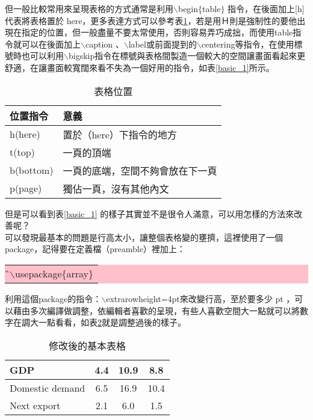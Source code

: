 但一般比較常用來呈現表格的方式通常是利用$\backslash$begin$\lbrace$table$\rbrace$ 指令，在後面加上[h]代表將表格置於 here，更多表達方式可以參考表\ref{location}，若是用Ｈ則是強制性的要他出現在指定的位置，但一般盡量不要太常使用，否則容易弄巧成拙，而使用table指令就可以在後面加上$\backslash$caption 、$\backslash$label或前面提到的$\backslash$centering等指令，在使用標號時也可以利用$\backslash$bigskip指令在標號與表格間製造一個較大的空間讓畫面看起來更舒適，在讓畫面較寬闊來看不失為一個好用的指令，如表\ref{basic_1}所示。\\
\begin{table}[h] 
    \centering 
    \caption{表格位置}\label{location}  %
    \bigskip
    \begin{tabular}{p{2.5cm}l}
    位置指令 & 意義 \\\toprule[0.8pt]
    h(here) & 置於（here）下指令的地方\\
    t(top) & 一頁的頂端\\
    b(bottom) & 一頁的底端，空間不夠會放在下一頁\\
    p(page) & 獨佔一頁，沒有其他內文\\\bottomrule[1pt]
    \end{tabular}
\end{table}
但是可以看到表\ref{basic_1} 的樣子其實並不是很令人滿意，可以用怎樣的方法來改善呢？\\
可以發現最基本的問題是行高太小，讓整個表格變的壅擠，這裡使用了一個package，記得要在定義檔（preamble）裡加上：
\begin{center}
	\colorbox{pink}{\begin{tabular}{p{}}
	{\G $\backslash$usepackage\{array\}}
\end{tabular}}
\end{center}
\bigskip
利用這個package的指令：$\backslash$extrarowheight=4pt來改變行高，至於要多少 pt ，可以藉由多次編譯做調整，依編輯者喜歡的呈現，有些人喜歡空間大一點就可以將數字在調大一點看看，如表\ref{basic_2}就是調整過後的樣子。\\
\begin{table}[h] 
	\centering 
	\caption{修改後的基本表格}\label{basic_2}  
	\extrarowheight=4pt   %
	\begin{tabular}{|l|ccc|}
	\hline  %
  GDP  & 4.4  & 10.9 & 8.8		\\\hline  %
  Domestic demand     & 6.5     & 16.9 & 10.4		\\\hline
  Next export  & 2.1     & 6.0	& 1.5		\\\hline
	\end{tabular}
\end{table}

